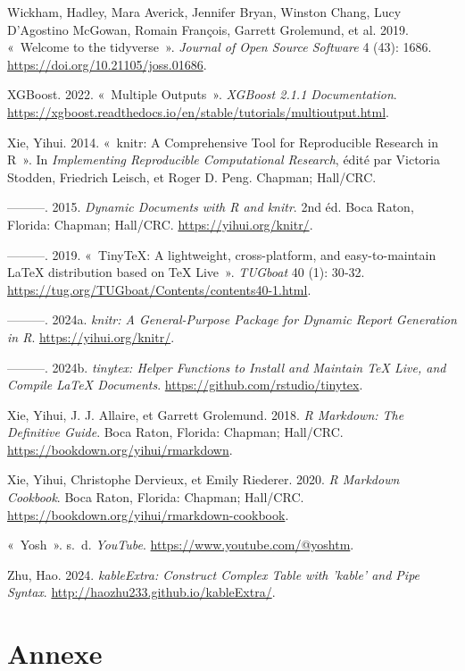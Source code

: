 \documentclass[
  oneside,
  open=any]{scrreprt}
\newlength{\cslhangindent}
\newenvironment{CSLReferences}[2] %
 {\begin{list}{}{%
  \setlength{\itemindent}{0pt}
  \setlength{\leftmargin}{0pt}
  \setlength{\parsep}{0pt}
  \ifodd #1
   \setlength{\leftmargin}{\cslhangindent}
   \setlength{\itemindent}{-1\cslhangindent}
  \fi
  \setlength{\itemsep}{#2\baselineskip}}}
 {\end{list}}
\begin{document}
\begin{CSLReferences}{1}{0}
Wickham, Hadley, Mara Averick, Jennifer Bryan, Winston Chang, Lucy
D'Agostino McGowan, Romain François, Garrett Grolemund, et al. 2019.
{«~Welcome to the {tidyverse}~»}. \emph{Journal of Open Source Software}
4 (43): 1686. \url{https://doi.org/10.21105/joss.01686}.

XGBoost. 2022. {«~Multiple Outputs~»}. \emph{XGBoost 2.1.1
Documentation}.
\url{https://xgboost.readthedocs.io/en/stable/tutorials/multioutput.html}.

Xie, Yihui. 2014. {«~knitr: A Comprehensive Tool for Reproducible
Research in {R}~»}. In \emph{Implementing Reproducible Computational
Research}, édité par Victoria Stodden, Friedrich Leisch, et Roger D.
Peng. Chapman; Hall/CRC.

---------. 2015. \emph{Dynamic Documents with {R} and knitr}. 2nd éd.
Boca Raton, Florida: Chapman; Hall/CRC. \url{https://yihui.org/knitr/}.

---------. 2019. {«~TinyTeX: A lightweight, cross-platform, and
easy-to-maintain LaTeX distribution based on TeX Live~»}. \emph{TUGboat}
40 (1): 30‑32. \url{https://tug.org/TUGboat/Contents/contents40-1.html}.

---------. 2024a. \emph{knitr: A General-Purpose Package for Dynamic
Report Generation in R}. \url{https://yihui.org/knitr/}.

---------. 2024b. \emph{tinytex: Helper Functions to Install and
Maintain TeX Live, and Compile LaTeX Documents}.
\url{https://github.com/rstudio/tinytex}.

Xie, Yihui, J. J. Allaire, et Garrett Grolemund. 2018. \emph{R Markdown:
The Definitive Guide}. Boca Raton, Florida: Chapman; Hall/CRC.
\url{https://bookdown.org/yihui/rmarkdown}.

Xie, Yihui, Christophe Dervieux, et Emily Riederer. 2020. \emph{R
Markdown Cookbook}. Boca Raton, Florida: Chapman; Hall/CRC.
\url{https://bookdown.org/yihui/rmarkdown-cookbook}.

{«~Yosh~»}. s.~d. \emph{YouTube}. \url{https://www.youtube.com/@yoshtm}.

Zhu, Hao. 2024. \emph{kableExtra: Construct Complex Table with 'kable'
and Pipe Syntax}. \url{http://haozhu233.github.io/kableExtra/}.

\end{CSLReferences}

\chapter{Annexe}\label{sec-annex}
\end{document}
